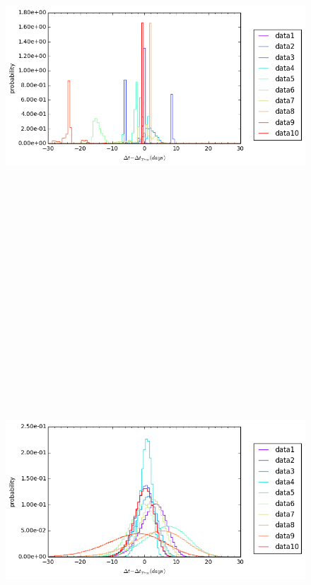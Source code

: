 \documentclass[\docopts]{\docclass}
\begin{document}
\begin{figure}[!h]
\includegraphics[width=\textwidth, height=15cm, keepaspectratio]{summary_posterior_summary.png}
\caption{}
\label{fig:summary_post}
\end{figure}

\begin{figure}[!h]
\includegraphics[width=\textwidth, height=15cm, keepaspectratio]{summary_prior_summary.png}
\caption{}
\label{fig:summary_prior}
\end{figure}
\end{document}
